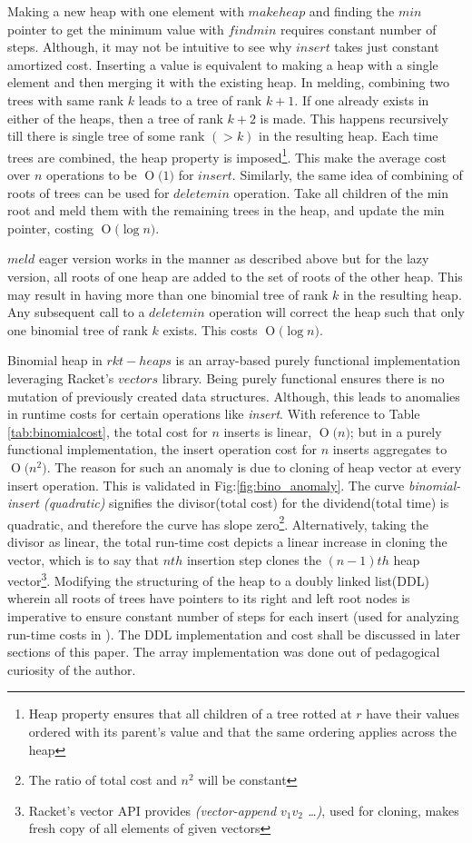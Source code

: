 \documentclass{llncs}
\newcommand{\BigO}[1]{\ensuremath{\operatorname{O}\bigl(#1\bigr)}}
\begin{document}
Making a new heap with one element with $makeheap$ and finding the $min$ pointer to get the minimum value with $findmin$ requires constant number of steps. Although, it may not be intuitive to see why $insert$ takes just constant amortized cost. Inserting a value is equivalent to making a heap with a single element and then merging it with the existing heap. In melding, combining two trees with same rank $k$ leads to a tree of rank $k+1$. If one already exists in either of the heaps, then a tree of rank $k+2$ is made. This happens recursively till there is single tree of some rank $(>k)$ in the resulting heap. Each time trees are combined, the heap property is imposed\footnote{Heap property ensures that all children of a tree rotted at $r$ have their values ordered with its parent's value and that the same ordering applies across the heap}. This make the average cost over $n$ operations to be \BigO{1} for $insert$. Similarly, the same idea of combining of roots of trees can be used for $deletemin$ operation. Take all children of the min root and meld them with the remaining trees in the heap, and update the min pointer, costing \BigO{\log n}.

$meld$ eager version works in the manner as described above but for the lazy version, all roots of one heap are added to the set of roots of the other heap. This may result in having more than one binomial tree of rank $k$ in the resulting heap. Any subsequent call to a $deletemin$ operation will correct the heap such that only one binomial tree of rank $k$ exists. This costs \BigO{\log n}.

Binomial heap in $rkt-heaps$ is an array-based purely functional implementation leveraging Racket's $vectors$ library. Being purely functional ensures there is no mutation of previously created data structures. Although, this leads to anomalies in runtime costs for certain operations like \emph{insert}. With reference to Table \ref{tab:binomialcost}, the total cost for $n$ inserts is linear, \BigO{n}; but in a purely functional implementation, the insert operation cost for $n$ inserts aggregates to \BigO{n^2}. The reason for such an anomaly is due to cloning of heap vector at every insert operation. This is validated in Fig:\ref{fig:bino_anomaly}. The curve \emph{binomial-insert (quadratic)} signifies the divisor(total cost) for the dividend(total time) is quadratic, and therefore the curve has slope zero\footnote{The ratio of total cost and $n^2$ will be constant}. Alternatively, taking the divisor as linear, the total run-time cost depicts a linear increase in cloning the vector, which is to say that $nth$ insertion step clones the $(n-1)th$ heap vector\footnote{Racket's vector API provides \emph{(vector-append $v_1 v_2$ \dots)}, used for cloning, makes fresh copy of all elements of given vectors}. Modifying the structuring of the heap to a doubly linked list(DDL) wherein all roots of trees have pointers to its right and left root nodes is imperative to ensure constant number of steps for each insert (used for analyzing run-time costs in \cite{kozen1992design}). The DDL implementation and cost shall be discussed in later sections of this paper. The array implementation was done out of pedagogical curiosity of the author.
\end{document}

